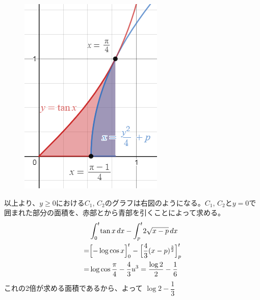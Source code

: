 \begin{figure}
 \includegraphics[width=\linewidth]{../problems/Q_149/A_149.png}
\end{figure}
以上より、$y\ge 0$における$C_1$, $C_2$のグラフは右図のようになる。$C_1$, $C_2$と$y=0$で囲まれた部分の面積を、赤部とから青部を引くことによって求める。
\begin{align*}
 & \int_0^t\! \tan x \,dx -\int_p^t\! 2\sqrt{x-p} \,dx \\
 =& \Bigl[-\log\cos x\Bigr]_0^t - \Bigl[\frac{4}{3}(x-p)^{\frac{3}{2}}\Bigr]_p^t \\
 =& \log\cos\frac{\pi}{4}-\frac{4}{3}u^3 = \frac{\log2}{2}-\frac{1}{6}
\end{align*}
これの2倍が求める面積であるから、よって $\log 2-\dfrac{1}{3}$